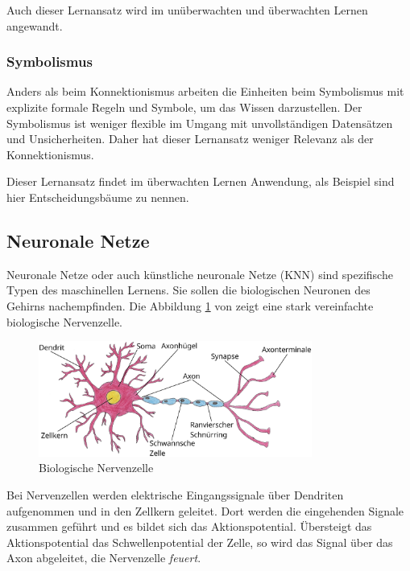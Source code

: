 Auch dieser Lernansatz wird im unüberwachten und überwachten Lernen angewandt.

\subsubsection{Symbolismus}
Anders als beim Konnektionismus arbeiten die Einheiten beim Symbolismus mit explizite formale Regeln und Symbole, um das Wissen darzustellen. Der Symbolismus ist weniger flexible im Umgang mit unvollständigen Datensätzen und Unsicherheiten. Daher hat dieser Lernansatz weniger Relevanz als der Konnektionismus.\vspace{0.2cm}

Dieser Lernansatz findet im überwachten Lernen Anwendung, als Beispiel sind hier Entscheidungsbäume zu nennen.



\subsection{Neuronale Netze}
Neuronale Netze oder auch künstliche neuronale Netze (\acrshort{KNN}) sind spezifische Typen des maschinellen Lernens. Sie sollen die biologischen Neuronen des Gehirns nachempfinden. Die Abbildung \ref{img:biological_neuron} von \cite{pahl-2024} zeigt eine stark vereinfachte biologische Nervenzelle.

\begin{figure}[!ht]
	\includegraphics[width=0.8\textwidth]{content/chapter_basics/images/biological_neuron.eps}
	\centering
	\caption{Biologische Nervenzelle}
	\label{img:biological_neuron}
\end{figure}

Bei Nervenzellen werden elektrische Eingangssignale über Dendriten aufgenommen und in den Zellkern geleitet. Dort werden die eingehenden Signale zusammen geführt und es bildet sich das Aktionspotential. Übersteigt das Aktionspotential das Schwellenpotential der Zelle, so wird das Signal über das Axon abgeleitet, die Nervenzelle \glqq \textit{feuert}\grqq.\vspace{0.2cm}

